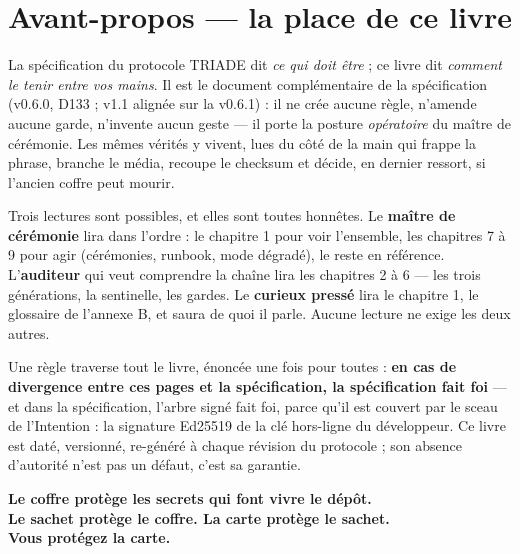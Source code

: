 \section*{Avant-propos — la place de ce livre}\label{sec:avantpropos}


La spécification du protocole TRIADE dit \emph{ce qui doit être} ; ce livre dit
\emph{comment le tenir entre vos mains}. Il est le document complémentaire de la
spécification (v0.6.0, D133 ; v1.1 alignée sur la v0.6.1) : il ne crée aucune règle,
n'amende aucune garde, n'invente aucun geste
— il porte la posture \emph{opératoire} du maître de cérémonie. Les mêmes vérités y
vivent, lues du côté de la main qui frappe la phrase, branche le média, recoupe le
checksum et décide, en dernier ressort, si l'ancien coffre peut mourir.

Trois lectures sont possibles, et elles sont toutes honnêtes. Le \textbf{maître de
cérémonie} lira dans l'ordre : le chapitre 1 pour voir l'ensemble, les chapitres 7 à 9
pour agir (cérémonies, runbook, mode dégradé), le reste en référence. L'\textbf{auditeur}
qui veut comprendre la chaîne lira les chapitres 2 à 6 — les trois générations, la
sentinelle, les gardes. Le \textbf{curieux pressé} lira le chapitre 1, le glossaire de
l'annexe B, et saura de quoi il parle. Aucune lecture ne exige les deux autres.

Une règle traverse tout le livre, énoncée une fois pour toutes : \textbf{en cas de
divergence entre ces pages et la spécification, la spécification fait foi} — et dans la
spécification, l'arbre signé  fait foi, parce qu'il est couvert par le
sceau de l'Intention : la signature Ed25519 de la clé hors-ligne du développeur. Ce
livre est daté, versionné, re-généré à chaque révision du protocole ; son absence
d'autorité n'est pas un défaut, c'est sa garantie.

\bigskip

\begin{center}
\large\bfseries Le coffre protège les secrets qui font vivre le dépôt.\\
Le sachet protège le coffre. La carte protège le sachet.\\
Vous protégez la carte.
\end{center}

